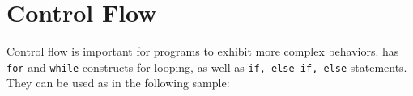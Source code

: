 \section{Control Flow}

Control flow is important for programs to exhibit more complex behaviors. \lepix{} has \lstinline|for| and \lstinline|while| constructs for looping, as well as \lstinline|if, else if, else| statements. They can be used as in the following sample:


